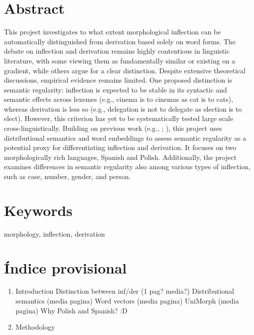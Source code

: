 \documentclass[12pt]{article}
\begin{document}
\section*{Abstract} %
This project investigates to what extent morphological inflection can be automatically distinguished from derivation based solely on word forms. The debate on inflection and derivation remains highly contentious in linguistic literature, with some viewing them as fundamentally similar or existing on a gradient, while others argue for a clear distinction. Despite extensive theoretical discussions, empirical evidence remains limited. One proposed distinction is semantic regularity: inflection is expected to be stable in its syntactic and semantic effects across lexemes (e.g., cinema is to cinemas as cat is to cats), whereas derivation is less so (e.g., delegation is not to delegate as election is to elect). However, this criterion has yet to be systematically tested large scale cross-linguistically. 
Building on previous work (e.g., \textcite{bonami2018InflectionVsDerivation}; \textcite{rosa2019AttemptingSeparateInflection}), this project uses distributional semantics and word embeddings to assess semantic regularity as a potential proxy for differentiating inflection and derivation. It focuses on two morphologically rich languages, Spanish and Polish. Additionally, the project examines differences in semantic regularity also among various types of inflection, such as case, number, gender, and person.

\section*{Keywords} %
morphology, inflection, derivation

\newpage
\tableofcontents %
\newpage


\section{Índice provisional}

\begin{enumerate}
    \item Introduction
    \subitem Distinction between inf/der (1 pag? media?)
    \subitem Distributional semantics (media pagina)
    \subitem Word vectors (media pagina)
    \subitem UniMorph (media pagina)
    \subitem Why Polish and Spanish? :D
    \item Methodology 
\end{enumerate}
\end{document}
